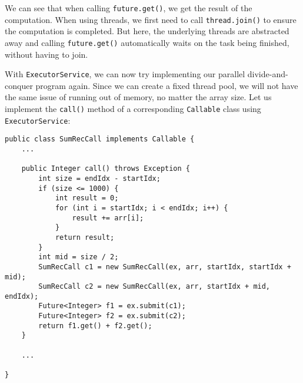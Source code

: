 \documentclass[main.tex]{subfiles}
\begin{document}
\noindent We can see that when calling \texttt{future.get()}, we get the result of the computation. When using threads, we first need to call \texttt{thread.join()} to ensure the computation is completed. But here, the underlying threads are abstracted away and calling \texttt{future.get()} automatically waits on the task being finished, without having to join.

With \texttt{ExecutorService}, we can now try implementing our parallel divide-and-conquer program again. Since we can create a fixed thread pool, we will not have the same issue of running out of memory, no matter the array size. Let us implement the \texttt{call()} method of a corresponding \texttt{Callable} class using \texttt{ExecutorService}:
\begin{verbatim}
public class SumRecCall implements Callable {
    ...

    public Integer call() throws Exception {
        int size = endIdx - startIdx;
        if (size <= 1000) {
            int result = 0;
            for (int i = startIdx; i < endIdx; i++) {
                result += arr[i];
            }
            return result;
        }
        int mid = size / 2;
        SumRecCall c1 = new SumRecCall(ex, arr, startIdx, startIdx + mid);
        SumRecCall c2 = new SumRecCall(ex, arr, startIdx + mid, endIdx);
        Future<Integer> f1 = ex.submit(c1);
        Future<Integer> f2 = ex.submit(c2);
        return f1.get() + f2.get();
    }

    ...

}
\end{verbatim}
\end{document}

